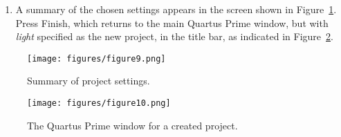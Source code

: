 \begin{enumerate}
\item A summary of the chosen settings appears in the screen shown in Figure~\ref{fig:9}.
Press {\sf Finish}, which returns to the main Quartus Prime window, 
but with {\it light} specified as the new project,
in the title bar, as indicated in Figure~\ref{fig:10}.
\end{enumerate}

\begin{figure}[H]
   \begin{center}
      \texttt{[image: figures/figure9.png]}
   \caption{Summary of project settings.} 
	 \label{fig:9}
	 \end{center}
\end{figure}

\begin{figure}[H]
   \begin{center}
      \texttt{[image: figures/figure10.png]}
   \caption{The Quartus Prime window for a created project.} 
	 \label{fig:10}
	 \end{center}
\end{figure}
